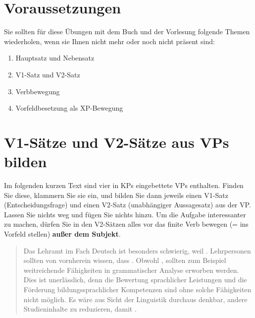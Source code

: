 \section*{Voraussetzungen}

Sie sollten für diese Übungen mit dem Buch und der Vorlesung folgende Themen wiederholen, wenn sie Ihnen nicht mehr oder noch nicht präsent sind:

\begin{enumerate}\Lf
  \item Hauptsatz und Nebensatz
  \item V1-Satz und V2-Satz
  \item Verbbewegung
  \item Vorfeldbesetzung als XP-Bewegung
\end{enumerate}

\Zeile

\section{V1-Sätze und V2-Sätze aus VPs bilden}\label{sec:bilden}

Im folgenden kurzen Text sind vier in KPs eingebettete VPs enthalten.
Finden Sie diese, klammern Sie sie ein, und bilden Sie dann jeweils einen V1-Satz (Entscheidungsfrage) und einen V2-Satz (unabhängiger Aussagesatz) aus der VP.
Lassen Sie nichts weg und fügen Sie nichts hinzu.
Um die Aufgabe interessanter zu machen, dürfen Sie in den V2-Sätzen alles vor das finite Verb bewegen (= ins Vorfeld stellen) \textbf{außer dem Subjekt}.

\begin{quote}
  Das Lehramt im Fach Deutsch ist besonders schwierig, weil .
  Lehrpersonen sollten von vornherein wissen, dass .
  Obwohl , sollten zum Beispiel weitreichende Fähigkeiten in grammatischer Analyse erworben werden.
  Dies ist unerlässlich, denn die Bewertung sprachlicher Leistungen und die Förderung bildungssprachlicher Kompetenzen sind ohne solche Fähigkeiten nicht möglich.
  Es wäre aus Sicht der Linguistik durchaus denkbar, andere Studieninhalte zu reduzieren, damit .
\end{quote}

